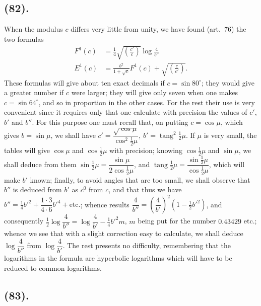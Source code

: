 \documentclass{article}
\begin{document}
\subsection*{(82).}

When the modulus $c$ differs very little from unity, we have found (art.~76) the two formulas
\[ \begin{aligned} F^{1}(c)&=\tfrac{1}{4}\sqrt{\left(\frac{c'}{c}\right)}\log\frac{4}{b''}\\ E^{1}(c)&=\frac{b^{2}}{1+\sqrt{c}}F^{1}(c)+\sqrt{\left(\frac{c}{c'}\right)}. \end{aligned} \]
These formulas will give about ten exact decimals if $c=\sin 80^{\circ}$; they would give a greater number if $c$ were larger; they will give only seven when one makes $c=\sin 64^{\circ}$, and so in proportion in the other cases. For the rest their use is very convenient since it requires only that one calculate with precision the values of $c'$, $b'$ and $b''$. For this purpose one must recall that, on putting $c=\cos\mu$, which gives $b=\sin\mu$, we shall have $c'=\dfrac{\sqrt{\cos\mu}}{\cos^{2}\frac{1}{2}\mu}$, $b'=\operatorname{tang}^{2}\frac{1}{2}\mu$. If $\mu$ is very small, the tables will give $\cos\mu$ and $\cos\frac{1}{2}\mu$ with precision; knowing $\cos\frac{1}{2}\mu$ and $\sin\mu$, we shall deduce from them $\sin\frac{1}{2}\mu=\dfrac{\sin\mu}{2\cos\frac{1}{2}\mu}$, and $\operatorname{tang}\frac{1}{2}\mu=\dfrac{\sin\frac{1}{2}\mu}{\cos\frac{1}{2}\mu}$, which will make $b'$ known; finally, to avoid angles that are too small, we shall observe that $b''$ is deduced from $b'$ as $c^{0}$ from $c$, and that thus we have $b''=\frac{1}{4}b'^{2}+\dfrac{1\cdot 3}{4\cdot 6}b'^{4}+\text{etc.}$; whence results $\dfrac{4}{b''}=\left(\dfrac{4}{b'}\right)^{2}(1-\frac{1}{2}b'^{2})$, and consequently $\frac{1}{2}\log\dfrac{4}{b''}=\log\dfrac{4}{b'}-\frac{1}{4}b'^{2}m$, $m$ being put for the number $0.43429$ etc.; whence we see that with a slight correction easy to calculate, we shall deduce $\log\dfrac{4}{b''}$ from $\log\dfrac{4}{b'}$. The rest presents no difficulty, remembering that the logarithms in the formula are hyperbolic logarithms which will have to be reduced to common logarithms.

\subsection*{(83).}
\end{document}

